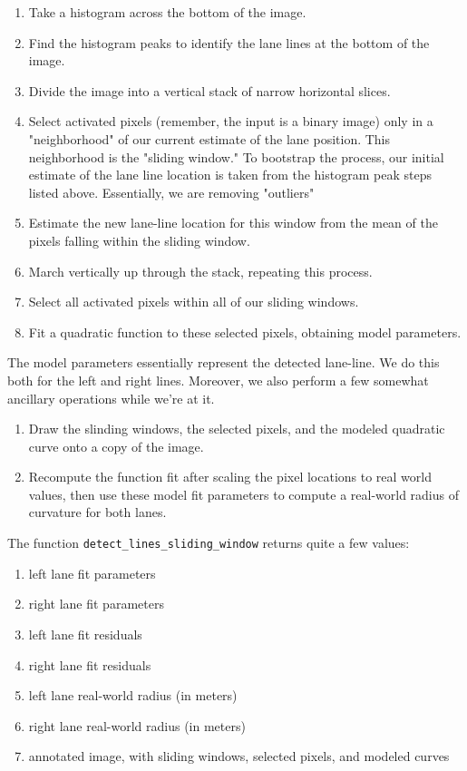 \documentclass[11pt]{article}
\begin{document}
\begin{enumerate}
\item Take a histogram across the bottom of the image.
\item Find the histogram peaks to identify the lane lines at the
bottom of the image.
\item Divide the image into a vertical stack of narrow horizontal
slices.
\item Select activated pixels (remember, the input is a binary
image) only in a "neighborhood" of our current estimate of
the lane position.  This neighborhood is the "sliding
window."  To bootstrap the process, our initial estimate of
the lane line location is taken from the histogram peak steps
listed above.  Essentially, we are removing "outliers"
\item Estimate the new lane-line location for this window from the
mean of the pixels falling within the sliding window.
\item March vertically up through the stack, repeating this process.
\item Select all activated pixels within all of our sliding windows.
\item Fit a quadratic function to these selected pixels, obtaining
model parameters.
\end{enumerate}

The model parameters essentially represent the detected
lane-line.  We do this both for the left and right lines.
Moreover, we also perform a few somewhat ancillary operations
while we're at it.

\begin{enumerate}
\item Draw the slinding windows, the selected pixels, and the
modeled quadratic curve onto a copy of the image.
\item Recompute the function fit after scaling the pixel locations
to real world values, then use these model fit parameters to
compute a real-world radius of curvature for both lanes.
\end{enumerate}

The function \texttt{detect\_lines\_sliding\_window} returns quite a few values:

\begin{enumerate}
\item left lane fit parameters
\item right lane fit parameters
\item left lane fit residuals
\item right lane fit residuals
\item left lane real-world radius (in meters)
\item right lane real-world radius (in meters)
\item annotated image, with sliding windows, selected pixels, and
modeled curves
\end{enumerate}
\end{document}
